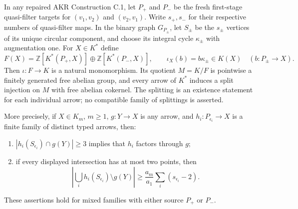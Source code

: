 \begin{theorem}\label{C:protected-cycles}
In any repaired AKR Construction C.1, let $P_+$ and $P_-$ be the fresh
first-stage quasi-filter targets for $(v_1,v_2)$ and $(v_2,v_1)$.
Write $s_+,s_-$ for their respective numbers of quasi-filter maps.
In the binary graph $G_{P_\pm}$, let $S_\pm$ be the $s_\pm$ vertices
of its unique circular component, and choose its integral cycle
$\kappa_\pm$ with augmentation one. For $X\in K^*$ define
\[
 F(X)=\mathbb Z[K^*(P_+,X)]\oplus\mathbb Z[K^*(P_-,X)],
 \qquad
 \iota_X(b)=b\kappa_\pm\in K(X)
 \quad(b:P_\pm\to X).
\]
Then $\iota:F\to K$ is a natural monomorphism. Its quotient $M=K/F$
is pointwise a finitely generated free abelian group, and every arrow
of $K^*$ induces a split injection on $M$ with free abelian cokernel.
The splitting is an existence statement for each individual arrow;
no compatible family of splittings is asserted.

More precisely, if $X\in K_m$, $m\geq1$, $g:Y\to X$ is any arrow,
and $h_i:P_{\epsilon_i}\to X$ is a finite family of distinct typed
arrows, then:
\begin{enumerate}
\item $|h_i(S_{\epsilon_i})\cap g(Y)|\geq3$ implies that $h_i$
factors through $g$;
\item if every displayed intersection has at most two points, then
\[
 \left|\bigcup_i h_i(S_{\epsilon_i})\setminus g(Y)\right|
 \geq\frac{a_m}{a_1}\sum_i(s_{\epsilon_i}-2).
\]
\end{enumerate}
These assertions hold for mixed families with either source $P_+$ or
$P_-$.
\end{theorem}
